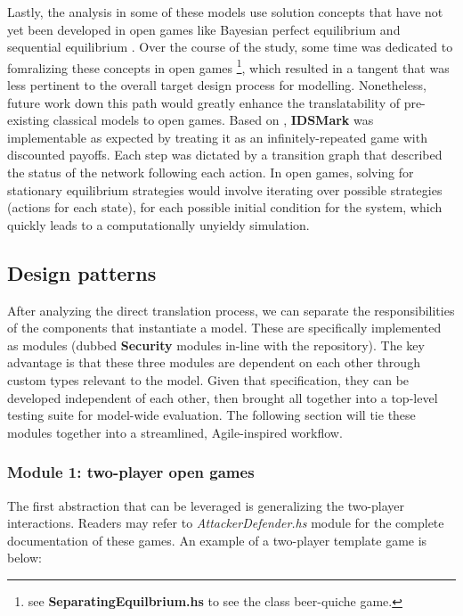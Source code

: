 \documentclass[11pt,titlepage,dvipsnames,table,xcdraw,english]{article}
\begin{document}
Lastly, the analysis in some of these models use solution concepts that have not yet been developed in open games like Bayesian perfect equilibrium and sequential equilibrium \cite{FUDENBERG1991236}. Over the course of the study, some time was dedicated to fomralizing these concepts in open games \footnote{see \textbf{SeparatingEquilbrium.hs} to see the class beer-quiche game.}, which resulted in a tangent that was less pertinent to the overall target design process for modelling. Nonetheless, future work down this path would greatly enhance the translatability of pre-existing classical models to open games. Based on \cite{ghani2017compositionaltreatmentiteratedopen}, \textbf{IDSMark} was implementable as expected by treating it as an infinitely-repeated game with discounted payoffs. Each step was dictated by a transition graph that described the status of the network following each action. In open games, solving for stationary equilibrium strategies would involve iterating over possible strategies (actions for each state), for each possible initial condition for the system, which quickly leads to a computationally unyieldy simulation. 



\subsection{Design patterns}
\label{designPatterns:library}
After analyzing the direct translation process, we can separate the responsibilities of the components that instantiate a model. These are specifically implemented as modules (dubbed \textbf{Security} modules in-line with the repository). The key advantage is that these three modules are dependent on each other through custom types relevant to the model. Given that specification, they can be developed independent of each other, then brought all together into a top-level testing suite for model-wide evaluation. The following section will tie these modules together into a streamlined, Agile-inspired workflow. 

\subsubsection{Module 1: two-player open games}
The first abstraction that can be leveraged is generalizing the two-player interactions. 
Readers may refer to \textit{AttackerDefender.hs} module for the complete documentation of these games. An example of a two-player template game is below: 
\end{document}
